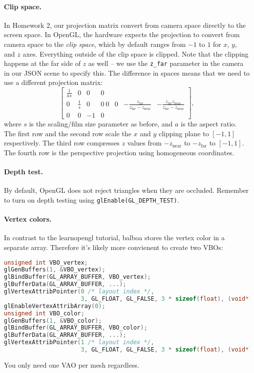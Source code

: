 \paragraph{Clip space.} In Homework 2, our projection matrix convert from camera space directly to the screen space. In OpenGL, the hardware expects the projection to convert from camera space to the \emph{clip space}, which by default ranges from $-1$ to $1$ for $x$, $y$, and $z$ axes. Everything outside of the clip space is clipped. Note that the clipping happens at the far side of $z$ as well -- we use the \lstinline{z_far} parameter in the camera in our JSON scene to specify this. The difference in spaces means that we need to use a different projection matrix:
\begin{equation}
\begin{bmatrix}
\frac{1}{as} & 0 & 0 & 0 \\
0 & \frac{1}{s} & 0 & 0 \
0 & 0 & -\frac{z_{\text{far}}}{z_{\text{far}} - z_{\text{near}}} & -\frac{z_{\text{far}} z_{\text{near}}}{z_{\text{far}} - z_{\text{near}}} \\
0 & 0 & -1 & 0
\end{bmatrix},
\end{equation} 
where $s$ is the scaling/film size parameter as before, and $a$ is the aspect ratio. The first row and the second row scale the $x$ and $y$ clipping plane to $[-1, 1]$ respectively. The third row compresses $z$ values from $-z_{\text{near}}$ to $-z_{\text{far}}$ to $[-1, 1]$. The fourth row is the perspective projection using homogeneous coordinates.

\paragraph{Depth test.} By default, OpenGL does not reject triangles when they are occluded. Remember to turn on depth testing using \lstinline{glEnable(GL_DEPTH_TEST)}.

\paragraph{Vertex colors.} In contrast to the learnopengl tutorial, balboa stores the vertex color in a separate array. Therefore it's likely more convienent to create two VBOs:
\begin{lstlisting}[language=C++]
unsigned int VBO_vertex;
glGenBuffers(1, &VBO_vertex);
glBindBuffer(GL_ARRAY_BUFFER, VBO_vertex);
glBufferData(GL_ARRAY_BUFFER, ...);
glVertexAttribPointer(0 /* layout index */,
                      3, GL_FLOAT, GL_FALSE, 3 * sizeof(float), (void*)0);
glEnableVertexAttribArray(0);
unsigned int VBO_color;
glGenBuffers(1, &VBO_color);
glBindBuffer(GL_ARRAY_BUFFER, VBO_color);
glBufferData(GL_ARRAY_BUFFER, ...);
glVertexAttribPointer(1 /* layout index */,
                      3, GL_FLOAT, GL_FALSE, 3 * sizeof(float), (void*)0);
\end{lstlisting}
You only need one VAO per mesh regardless.

